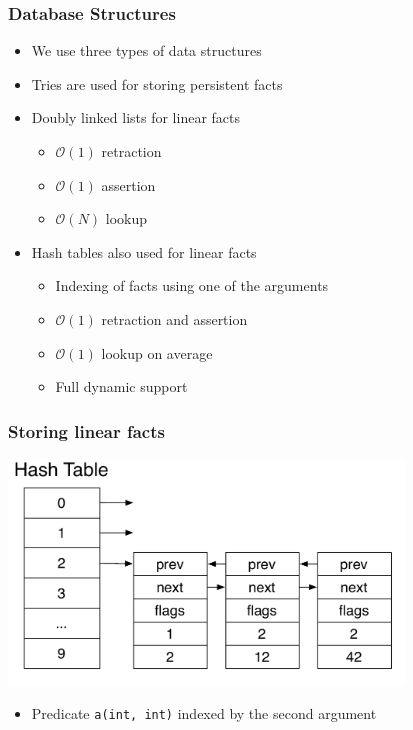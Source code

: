\documentclass{beamer}
\begin{document}
\begin{frame}[fragile]
   \frametitle{Database Structures}
   \begin{itemize}
      \item We use three types of data structures
      \item Tries are used for storing persistent facts
      \item Doubly linked lists for linear facts
      \begin{itemize}
         \item $\mathcal{O}(1)$ retraction
         \item $\mathcal{O}(1)$ assertion
         \item $\mathcal{O}(N)$ lookup
      \end{itemize}
      \item Hash tables also used for linear facts
      \begin{itemize}
         \item Indexing of facts using one of the arguments
         \item $\mathcal{O}(1)$ retraction and assertion
         \item $\mathcal{O}(1)$ lookup on average
         \item Full dynamic support
      \end{itemize}
   \end{itemize}
\end{frame}

\begin{frame}[fragile]
   \frametitle{Storing linear facts}
   \begin{center}
      \includegraphics[height=6cm]{hash_table.pdf}
   \end{center}
   \begin{itemize}
      \item {\large Predicate \texttt{a(int, int)} indexed by the second argument}
   \end{itemize}
\end{frame}
\end{document}
